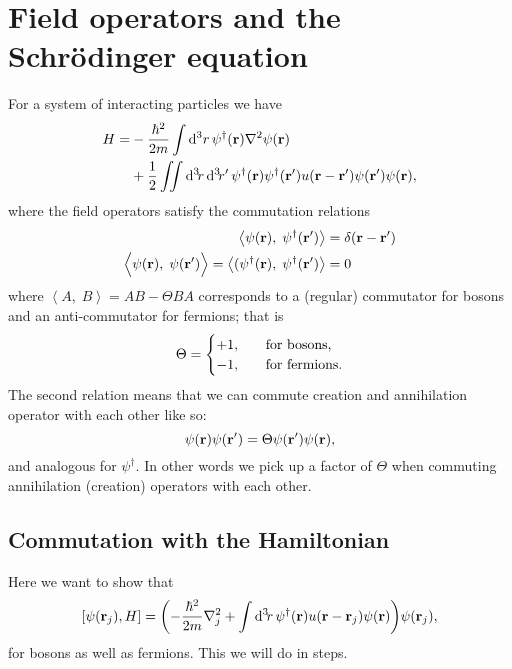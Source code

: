 \documentclass[11pt,letter, swedish, english
]{article}
\begin{document}
\section{Field operators and the Schrödinger equation}
\newcommand{\scomm}[2]{\left\langle#1,\;#2\right\rangle}
\newcommand{\Scomm}[2]{\langle#1,\;#2\rangle}
\newcommand{\commute}[1]{\overbrace{#1}^{\text{commute}}}
For a system of interacting particles we have
\begin{equation}\label{eq:4_want_this}
\begin{aligned}
H=&-\frac{\hbar^2}{2m}\int\rd^3r\,
\psi^\dagger(\vb{r})\laplacian\psi(\vb{r})\\
&+\frac{1}{2}\iint\rd^3\!r\,\rd^3\!r'\,
\psi^\dagger(\vb{r})\psi^\dagger(\vb{r}')
u(\vb{r}-\vb{r}')\psi(\vb{r}')\psi(\vb{r}),
\end{aligned}
\end{equation}
where the field operators satisfy the commutation relations
\begin{equation}\label{eq:4_comm}
\begin{aligned}
\scomm{\psi(\vb{r})}{\psi^\dagger(\vb{r}')}
&=\delta(\vb{r}-\vb{r}')\\
\scomm{\psi(\vb{r})}{\psi(\vb{r}')\Big.}=
\scomm{(\psi^\dagger(\vb{r})}{\psi^\dagger(\vb{r}')}&=0
\end{aligned}
\end{equation}
where $\scomm{A}{B}=AB-\Theta BA$ corresponds to a (regular)
commutator for bosons and an anti-commutator for fermions; that is
\begin{equation}
\Theta=
\begin{cases}
+1\qcomma&\text{for bosons,}\\
-1\qcomma&\text{for fermions.}
\end{cases}
\end{equation}
The second
relation means that we can commute creation and annihilation operator
with each other like so:
\begin{equation}
\psi(\vb{r})\psi(\vb{r}')=\Theta\psi(\vb{r}')\psi(\vb{r}),
\end{equation}
and analogous for $\psi^\dagger$. In other words we pick up a factor
of $\Theta$ when commuting annihilation (creation) operators with
each other.


\subsection{Commutation with the Hamiltonian}
Here we want to show that 
\begin{equation}
\comm{\psi(\vb{r}_j)}{H}
=\qty(-\frac{\hbar^2}{2m}\laplacian_j
+\int\rd^3\!r\,
\psi^\dagger(\vb{r})
u(\vb{r}-\vb{r}_j)\psi(\vb{r})
)\psi(\vb{r}_j),
\end{equation}
for bosons as well as fermions.
This we will do in steps.
\end{document}
